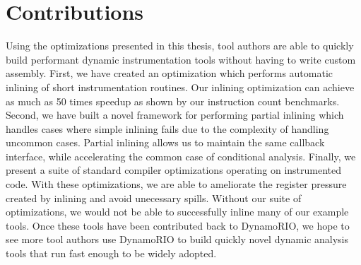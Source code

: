 \chapter{Contributions}
\label{sec:contributions}


Using the optimizations presented in this thesis, tool authors are able to
quickly build performant dynamic instrumentation tools without having to write
custom assembly.  First, we have created an optimization which performs
automatic inlining of short instrumentation routines.  Our inlining optimization
can achieve as much as 50 times speedup as shown by our instruction count
benchmarks.  Second, we have built a novel framework for performing partial
inlining which handles cases where simple inlining fails due to the complexity
of handling uncommon cases.  Partial inlining allows us to maintain the same
callback interface, while accelerating the common case of conditional analysis.
Finally, we present a suite of standard compiler optimizations operating on
instrumented code.  With these optimizations, we are able to ameliorate the
register pressure created by inlining and avoid unecessary spills.  Without our
suite of optimizations, we would not be able to successfully inline many of our
example tools.  Once these tools have been contributed back to DynamoRIO, we
hope to see more tool authors use DynamoRIO to build quickly novel dynamic
analysis tools that run fast enough to be widely adopted.
